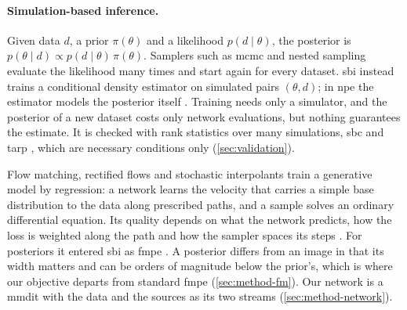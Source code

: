 \paragraph{Simulation-based inference.}
\label{sec:inversion}\label{sec:background-generative}
Given data $d$, a prior $\pi(\theta)$ and a likelihood $p(d\mid\theta)$, the posterior is
$p(\theta\mid d)\propto p(d\mid\theta)\,\pi(\theta)$. Samplers such as \ac{mcmc} and nested
sampling \citep{skilling2006nested} evaluate the likelihood many times and start again for every
dataset. \Ac{sbi} \citep{cranmer2020frontier} instead trains a conditional density
estimator on simulated pairs $(\theta,d)$; in \ac{npe} the estimator models the posterior itself
\citep{papamakarios2016fast,greenberg2019automatic}. Training needs only a simulator, and the
posterior of a new dataset costs only network evaluations, but nothing guarantees the estimate. It
is checked with rank statistics over many simulations, \ac{sbc} \citep{talts2018validating} and
\ac{tarp} \citep{lemos2023sampling}, which are necessary conditions only (\cref{sec:validation}).

Flow matching, rectified flows and stochastic interpolants
\citep{lipman2023flow,liu2023flow,albergo2023building} train a generative model by regression: a
network learns the velocity that carries a simple base distribution to the data along prescribed
paths, and a sample solves an ordinary differential equation. Its quality depends on what the
network predicts, how the loss is weighted along the path and how the sampler spaces its steps
\citep{karras2022elucidating,kingma2023understanding}. For posteriors it entered \acs{sbi}
as \ac{fmpe} \citep{dax2023flow}. A posterior differs from an image in that its width
matters and can be orders of magnitude below the prior's, which is where our objective departs from
standard \ac{fmpe} (\cref{sec:method-fm}). Our network is a \ac{mmdit}
\citep{peebles2023scalable,esser2024scaling} with the data and the sources as its two streams
(\cref{sec:method-network}).

